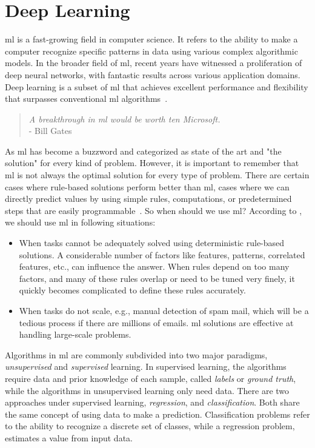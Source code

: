 
 
\newpage
\section{Deep Learning}
\Acf{ml} is a fast-growing field in computer science. It refers to the ability to make a computer recognize specific patterns in data using various complex algorithmic models. In the broader field of \ac{ml}, recent years have witnessed a proliferation of deep neural networks, with fantastic results across various application domains. Deep learning is a subset of \ac{ml} that achieves excellent performance and flexibility that surpasses conventional \ac{ml} algorithms~\cite{mike_voets, dl_anomaly}.

\begin{quote}
    \emph{A breakthrough in \acl{ml} would be worth ten Microsoft.} \\- Bill Gates
\end{quote}

As \ac{ml} has become a buzzword and categorized as state of the art and "the solution" for every kind of problem. However, it is important to remember that \ac{ml} is not always the optimal solution for every type of problem. There are certain cases where rule-based solutions perform better than \ac{ml}, cases where we can directly predict values by using simple rules, computations, or predetermined steps that are easily programmable~\cite{aws}. So when should we use \ac{ml}? According to \cite{aws}, we should use \ac{ml} in following situations:

\begin{itemize}
    \item When tasks cannot be adequately solved using deterministic rule-based solutions. A considerable number of factors like features, patterns, correlated features, etc., can influence the answer. When rules depend on too many factors, and many of these rules overlap or need to be tuned very finely, it quickly becomes complicated to define these rules accurately.
    \item When tasks do not scale, e.g., manual detection of spam mail, which will be a tedious process if there are millions of emails. \ac{ml} solutions are effective at handling large-scale problems.
\end{itemize}

Algorithms in \Ac{ml} are commonly subdivided into two major paradigms, \emph{unsupervised} and \emph{supervised} learning. In supervised learning, the algorithms require data and prior knowledge of each sample, called \emph{labels} or \emph{ground truth}, while the algorithms in unsupervised learning only need data. There are two approaches under supervised learning, \emph{regression}, and \emph{classification}. Both share the same concept of using data to make a prediction. Classification problems refer to the ability to recognize a discrete set of classes, while a regression problem, estimates a value from input data.

